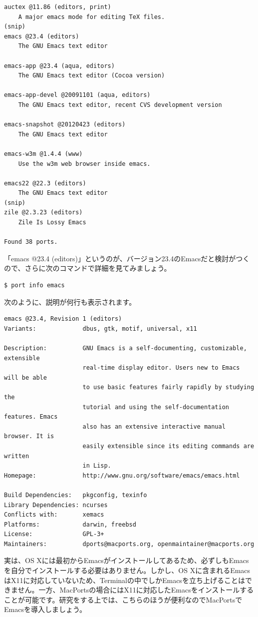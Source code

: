 \begin{lstlisting}
auctex @11.86 (editors, print)
    A major emacs mode for editing TeX files.
(snip)
emacs @23.4 (editors)
    The GNU Emacs text editor

emacs-app @23.4 (aqua, editors)
    The GNU Emacs text editor (Cocoa version)

emacs-app-devel @20091101 (aqua, editors)
    The GNU Emacs text editor, recent CVS development version

emacs-snapshot @20120423 (editors)
    The GNU Emacs text editor

emacs-w3m @1.4.4 (www)
    Use the w3m web browser inside emacs.

emacs22 @22.3 (editors)
    The GNU Emacs text editor
(snip)
zile @2.3.23 (editors)
    Zile Is Lossy Emacs

Found 38 ports.
\end{lstlisting}

「emacs @23.4 (editors)」というのが、バージョン23.4のEmacsだと検討がつくので、さらに次のコマンドで詳細を見てみましょう。

\begin{lstlisting}[language=bash]
$ port info emacs
\end{lstlisting}

次のように、説明が何行も表示されます。
\begin{lstlisting}
emacs @23.4, Revision 1 (editors)
Variants:             dbus, gtk, motif, universal, x11

Description:          GNU Emacs is a self-documenting, customizable, extensible
                      real-time display editor. Users new to Emacs will be able
                      to use basic features fairly rapidly by studying the
                      tutorial and using the self-documentation features. Emacs
                      also has an extensive interactive manual browser. It is
                      easily extensible since its editing commands are written
                      in Lisp.
Homepage:             http://www.gnu.org/software/emacs/emacs.html

Build Dependencies:   pkgconfig, texinfo
Library Dependencies: ncurses
Conflicts with:       xemacs
Platforms:            darwin, freebsd
License:              GPL-3+
Maintainers:          dports@macports.org, openmaintainer@macports.org
\end{lstlisting}

実は、OS Xには最初からEmacsがインストールしてあるため、必ずしもEmacsを自分でインストールする必要はありません。しかし、OS Xに含まれるEmacsはX11に対応していないため、Terminalの中でしかEmacsを立ち上げることはできません。一方、MacPortsの場合にはX11に対応したEmacsをインストールすることが可能です。研究をする上では、こちらのほうが便利なのでMacPortsでEmacsを導入しましょう。

